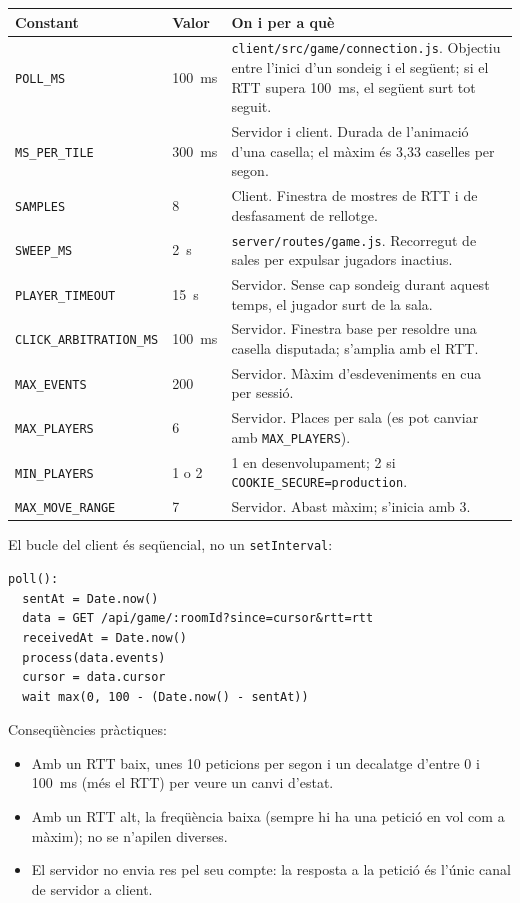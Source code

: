 \documentclass[10pt,a4paper]{article}
\begin{document}
\begin{table}[ht]
\small
\begin{tabularx}{\textwidth}{@{}p{5.3cm}p{2.4cm}X@{}}
\toprule
\textbf{Constant} & \textbf{Valor} & \textbf{On i per a què} \\
\midrule
\texttt{POLL\_MS} & 100~ms & \texttt{client/src/game/connection.js}. Objectiu entre
l'inici d'un sondeig i el següent; si el RTT supera 100~ms, el següent surt tot seguit. \\
\texttt{MS\_PER\_TILE} & 300~ms & Servidor i client. Durada de l'animació d'una
casella; el màxim és 3,33 caselles per segon. \\
\texttt{SAMPLES} & 8 & Client. Finestra de mostres de RTT i de desfasament de rellotge. \\
\texttt{SWEEP\_MS} & 2~s & \texttt{server/routes/game.js}. Recorregut de sales per
expulsar jugadors inactius. \\
\texttt{PLAYER\_TIMEOUT} & 15~s & Servidor. Sense cap sondeig durant aquest temps, el
jugador surt de la sala. \\
\texttt{CLICK\_ARBITRATION\_MS} & 100~ms & Servidor. Finestra base per resoldre una
casella disputada; s'amplia amb el RTT. \\
\texttt{MAX\_EVENTS} & 200 & Servidor. Màxim d'esdeveniments en cua per sessió. \\
\texttt{MAX\_PLAYERS} & 6 & Servidor. Places per sala (es pot canviar amb
\texttt{MAX\_PLAYERS}). \\
\texttt{MIN\_PLAYERS} & 1 o 2 & 1 en desenvolupament; 2 si
\texttt{COOKIE\_SECURE=production}. \\
\texttt{MAX\_MOVE\_RANGE} & 7 & Servidor. Abast màxim; s'inicia amb 3. \\
\bottomrule
\end{tabularx}
\end{table}

El bucle del client és seqüencial, no un \texttt{setInterval}:

\begin{lstlisting}
poll():
  sentAt = Date.now()
  data = GET /api/game/:roomId?since=cursor&rtt=rtt
  receivedAt = Date.now()
  process(data.events)
  cursor = data.cursor
  wait max(0, 100 - (Date.now() - sentAt))
\end{lstlisting}

Conseqüències pràctiques:

\begin{itemize}[nosep]
  \item Amb un RTT baix, unes 10 peticions per segon i un decalatge d'entre 0 i 100~ms
        (més el RTT) per veure un canvi d'estat.
  \item Amb un RTT alt, la freqüència baixa (sempre hi ha una petició en vol com a
        màxim); no se n'apilen diverses.
  \item El servidor no envia res pel seu compte: la resposta a la petició és l'únic
        canal de servidor a client.
\end{itemize}
\end{document}
